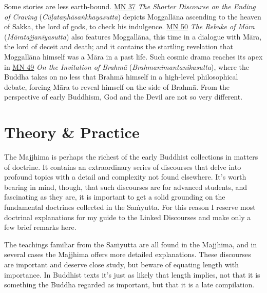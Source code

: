 \documentclass[12pt,openany]{book}%
\begin{document}
Some stories are less earth-bound. \href{https://suttacentral.net/mn37}{MN 37} \textit{The Shorter Discourse on the Ending of Craving} (\textit{\textsanskrit{Cūḷataṇhāsaṅkhayasutta}}) depicts \textsanskrit{Moggallāna} ascending to the heaven of Sakka, the lord of gods, to check his indulgence. \href{https://suttacentral.net/mn50}{MN 50} \textit{The Rebuke of \textsanskrit{Māra}} (\textit{\textsanskrit{Māratajjanīyasutta}}) also features \textsanskrit{Moggallāna}, this time in a dialogue with \textsanskrit{Māra}, the lord of deceit and death; and it contains the startling revelation that \textsanskrit{Moggallāna} himself was a \textsanskrit{Māra} in a past life. Such cosmic drama reaches its apex in \href{https://suttacentral.net/mn49}{MN 49} \textit{On the Invitation of \textsanskrit{Brahmā}} (\textit{Brahmanimantanikasutta}), where the Buddha takes on no less that \textsanskrit{Brahmā} himself in a high-level philosophical debate, forcing \textsanskrit{Māra} to reveal himself on the side of \textsanskrit{Brahmā}. From the perspective of early Buddhism, God and the Devil are not so very different.

\section*{Theory \& Practice}

The Majjhima is perhaps the richest of the early Buddhist collections in matters of doctrine. It contains an extraordinary series of discourses that delve into profound topics with a detail and complexity not found elsewhere. It’s worth bearing in mind, though, that such discourses are for advanced students, and fascinating as they are, it is important to get a solid grounding on the fundamental doctrines collected in the \textsanskrit{Saṁyutta}. For this reason I reserve most doctrinal explanations for my guide to the Linked Discourses and make only a few brief remarks here.

The teachings familiar from the \textsanskrit{Saṁyutta} are all found in the Majjhima, and in several cases the Majjhima offers more detailed explanations. These discourses are important and deserve close study, but beware of equating length with importance. In Buddhist texts it’s just as likely that length implies, not that it is something the Buddha regarded as important, but that it is a late compilation.
\end{document}
